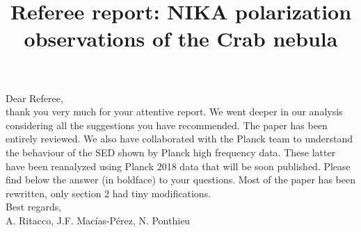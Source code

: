 \documentclass[12pt]{article}
\title{Referee report: NIKA polarization observations of the Crab nebula}
\begin{document}
\maketitle
Dear Referee,\\
thank you very much for your attentive report. 
We went deeper in our analysis considering all the suggestions you have recommended. 
The paper has been entirely reviewed.
We also have collaborated with the Planck team to understand the behaviour of the SED shown by Planck high frequency data. These latter have been reanalyzed using Planck 2018 data that will be soon published. Please find below the answer (in boldface) to your questions. Most of the paper has been rewritten, only section 2 had tiny modifications. \\
Best regards,\\
A. Ritacco, J.F. Macías-Pérez, N. Ponthieu
\end{document}
